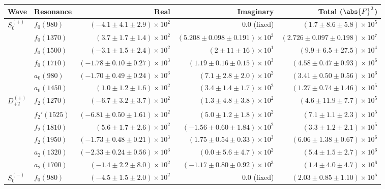 \begin{table}[ht]
    \begin{center}
        \begin{tabular}{llrrr}\toprule
        Wave & Resonance & Real & Imaginary & Total ($\abs{F}^2$) \\\midrule
$S_{0}^{(+)}$ & $f_{0}(980)$ & $(-4.1 \pm 4.1 \pm 2.9) \times 10^{2}$ & $0.0$ (fixed) & $(1.7 \pm 8.6 \pm 5.8) \times 10^{5}$ \\
 & $f_{0}(1370)$ & $(3.7 \pm 1.7 \pm 1.4) \times 10^{2}$ & $(5.208 \pm 0.098 \pm 0.191) \times 10^{3}$ & $(2.726 \pm 0.097 \pm 0.198) \times 10^{7}$ \\
 & $f_{0}(1500)$ & $(-3.1 \pm 1.5 \pm 2.4) \times 10^{2}$ & $(2 \pm 11 \pm 16) \times 10^{1}$ & $(9.9 \pm 6.5 \pm 27.5) \times 10^{4}$ \\
 & $f_{0}(1710)$ & $(-1.78 \pm 0.10 \pm 0.27) \times 10^{3}$ & $(1.19 \pm 0.16 \pm 0.15) \times 10^{3}$ & $(4.58 \pm 0.47 \pm 0.93) \times 10^{6}$ \\
 & $a_{0}(980)$ & $(-1.70 \pm 0.49 \pm 0.24) \times 10^{3}$ & $(7.1 \pm 2.8 \pm 2.0) \times 10^{2}$ & $(3.41 \pm 0.50 \pm 0.56) \times 10^{6}$ \\
 & $a_{0}(1450)$ & $(1.0 \pm 1.2 \pm 1.6) \times 10^{2}$ & $(3.4 \pm 1.4 \pm 1.7) \times 10^{2}$ & $(1.27 \pm 0.74 \pm 1.46) \times 10^{5}$ \\
$D_{+2}^{(+)}$ & $f_{2}(1270)$ & $(-6.7 \pm 3.2 \pm 3.7) \times 10^{2}$ & $(1.3 \pm 4.8 \pm 3.8) \times 10^{2}$ & $(4.6 \pm 11.9 \pm 7.7) \times 10^{5}$ \\
 & $f_{2}'(1525)$ & $(-6.81 \pm 0.50 \pm 1.61) \times 10^{2}$ & $(5.0 \pm 1.2 \pm 1.8) \times 10^{2}$ & $(7.1 \pm 1.1 \pm 2.3) \times 10^{5}$ \\
 & $f_{2}(1810)$ & $(5.6 \pm 1.7 \pm 2.6) \times 10^{2}$ & $(-1.56 \pm 0.60 \pm 1.84) \times 10^{2}$ & $(3.3 \pm 1.2 \pm 2.1) \times 10^{5}$ \\
 & $f_{2}(1950)$ & $(-1.73 \pm 0.48 \pm 0.21) \times 10^{3}$ & $(1.75 \pm 0.54 \pm 0.33) \times 10^{3}$ & $(6.06 \pm 1.38 \pm 0.67) \times 10^{6}$ \\
 & $a_{2}(1320)$ & $(-2.33 \pm 0.24 \pm 0.56) \times 10^{3}$ & $(0.0 \pm 5.6 \pm 4.7) \times 10^{2}$ & $(5.4 \pm 1.5 \pm 2.7) \times 10^{6}$ \\
 & $a_{2}(1700)$ & $(-1.4 \pm 2.2 \pm 8.0) \times 10^{2}$ & $(-1.17 \pm 0.80 \pm 0.92) \times 10^{3}$ & $(1.4 \pm 4.0 \pm 4.7) \times 10^{6}$ \\
$S_{0}^{(-)}$ & $f_{0}(980)$ & $(-4.5 \pm 1.5 \pm 2.0) \times 10^{2}$ & $0.0$ (fixed) & $(2.03 \pm 0.85 \pm 1.10) \times 10^{5}$ \\

\end{tabular}
\end{center}
\end{table}
